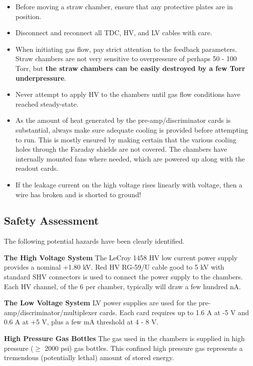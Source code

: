 \begin{itemize}

\item{Before moving a straw chamber, ensure that any protective
plates are in position.}

\item{Disconnect and reconnect all TDC, HV, and LV cables with care.}

\item{When initiating gas flow, pay strict attention to the feedback
parameters.
Straw chambers are not very sensitive to overpressure of perhaps
50 - 100 Torr,
but {\bf the straw chambers can be easily destroyed by a few Torr 
underpressure}. }

\item{Never attempt to apply HV to the chambers until gas flow
conditions have reached steady-state.}

\item{As the amount of heat generated by the pre-amp/discriminator
cards is substantial, always make sure adequate cooling is provided
before attempting to run.
This is mostly ensured by making certain that the various
cooling holes through the Faraday shields are not covered.
The chambers have internally mounted fans where needed, which
are powered up along with the readout cards.}

\item{If the leakage current on the high voltage rises linearly
with voltage, then a wire has broken and
is shorted to ground!}

\end{itemize}

\subsection{Safety Assessment}
The following potential hazards have been clearly identified.

\begin{description}

\item {\bf The High Voltage System}
The LeCroy 1458 HV low current power supply provides a nominal
+1.80 kV.
Red HV RG-59/U cable good to 5 kV with standard SHV connectors is used
to connect the power supply to the chambers.
Each HV channel, of the 6 per chamber, typically will draw a few hundred nA.

\item {\bf The Low Voltage System}
LV power supplies are used for the pre-amp/discriminator/multiplexer
cards.
Each card requires up to 
1.6 A at -5 V and 0.6 A at +5 V, plus a few mA threshold at 4 - 8 V.

\item{\bf High Pressure Gas Bottles} The  gas used 
in the chambers is supplied in high pressure ($\ge$ 2000 psi) gas
bottles. This confined high pressure gas represents a tremendous
(potentially lethal) amount of stored energy.
\end{description}

